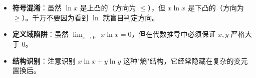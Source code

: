 \begin{trapbox}
\begin{itemize}
    \item \textbf{符号混淆}：虽然 $\ln x$ 是上凸的（方向为 $\leqslant$），但 $x\ln x$ 是下凸的（方向为 $\geqslant$）。千万不要因为看到 $\ln$ 就盲目判定方向。
    \item \textbf{定义域陷阱}：虽然 $\lim_{x\to 0^+} x\ln x = 0$，但在代数推导中必须保证 $x, y$ 严格大于 0。
    \item \textbf{结构识别}：注意识别 $x\ln x + y\ln y$ 这种"熵"结构，它经常隐藏在复杂的变元置换后。
\end{itemize}
\end{trapbox}